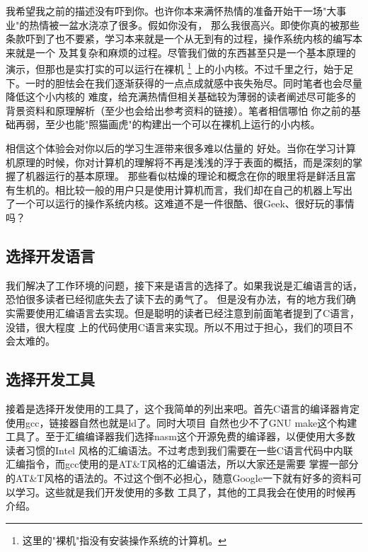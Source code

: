 \par 我希望我之前的描述没有吓到你。也许你本来满怀热情的准备开始干一场"大事业"的热情被一盆水浇凉了很多。假如你没有，\allowbreak
那么我很高兴。即使你真的被那些条款吓到了也不要紧，学习本来就是一个从无到有的过程，操作系统内核的编写本来就是一个\allowbreak
及其复杂和麻烦的过程。尽管我们做的东西甚至只是一个基本原理的演示，但那也是实打实的可以运行在裸机\allowbreak
\footnote{这里的"裸机"指没有安装操作系统的计算机。}
上的小内核。不过千里之行，始于足下。一时的胆怯会在我们逐渐获得的一点点成就感中丧失殆尽。同时笔者也会尽量降低这个小内核的\allowbreak
难度，给充满热情但相关基础较为薄弱的读者阐述尽可能多的背景资料和原理解析（至少也会给出参考资料的链接）。笔者相信哪怕\allowbreak
你之前的基础再弱，至少也能"照猫画虎"的构建出一个可以在裸机上运行的小内核。
\par 相信这个体验会对你以后的学习生涯带来很多难以估量的\allowbreak
好处。当你在学习计算机原理的时候，你对计算机的理解将不再是浅浅的浮于表面的概括，而是深刻的掌握了机器运行的基本原理。\allowbreak
那些看似枯燥的理论和概念在你的眼里将是鲜活且富有生机的。相比较一般的用户只是使用计算机而言，我们却在自己的机器上写出\allowbreak
了一个可以运行的操作系统内核。这难道不是一件很酷、很Geek、很好玩的事情吗？

\subsection{选择开发语言}
\par 我们解决了工作环境的问题，接下来是语言的选择了。如果我说是汇编语言的话，恐怕很多读者已经彻底失去了读下去的勇气了。\allowbreak
但是没有办法，有的地方我们确实需要使用汇编语言去实现。但是聪明的读者已经注意到前面笔者提到了C语言，没错，很大程度\allowbreak
上的代码使用C语言来实现。所以不用过于担心，我们的项目不会太难的。

\subsection{选择开发工具}
\par 接着是选择开发使用的工具了，这个我简单的列出来吧。首先C语言的编译器肯定使用gcc，链接器自然也就是ld了。同时大项目\allowbreak
自然也少不了GNU make这个构建工具了。至于汇编编译器我们选择nasm这个开源免费的编译器，以便使用大多数读者习惯的Intel\allowbreak
风格的汇编语法。不过考虑到我们需要在一些C语言代码中内联汇编指令，而gcc使用的是AT\&T风格的汇编语法，所以大家还是需要\allowbreak
掌握一部分的AT\&T风格的语法的。不过这个倒不必担心，随意Google一下就有好多的资料可以学习。这些就是我们开发使用的多数\allowbreak
工具了，其他的工具我会在使用的时候再介绍。

